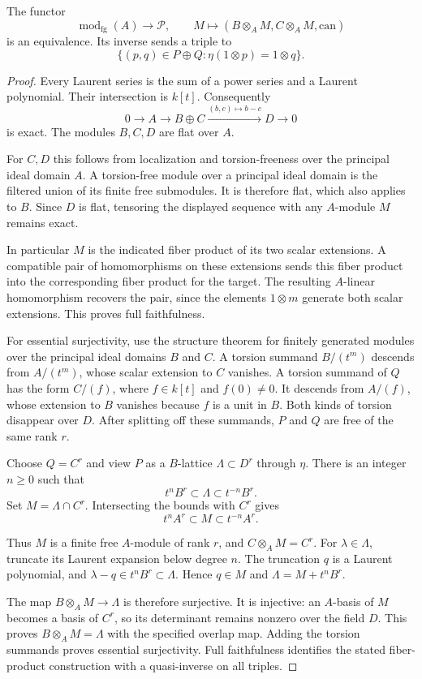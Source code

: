 \begin{theorem}
\label{v4-arith:ic:w5-h:formal-patching}
The functor
\[
 \operatorname{mod}_{\mathrm{fg}}(A)\longrightarrow\mathcal P,
 \qquad M\longmapsto(B\otimes_A M,C\otimes_A M,\mathrm{can})
\]
is an equivalence. Its inverse sends a triple to
\[
 \{(p,q)\in P\oplus Q:\eta(1\otimes p)=1\otimes q\}.
\]
\end{theorem}
\begin{proof}
Every Laurent series is the sum of a power series and a Laurent
polynomial. Their intersection is $k[t]$. Consequently
\[
 0\longrightarrow A\longrightarrow B\oplus C
 \xrightarrow{(b,c)\mapsto b-c}D\longrightarrow0
\]
is exact. The modules $B,C,D$ are flat over $A$.

For $C,D$ this follows from localization and torsion-freeness over
the principal ideal domain $A$. A torsion-free module over a principal ideal domain is the
filtered union of its finite free submodules. It is therefore flat,
which also applies to $B$.
Since $D$ is flat, tensoring the displayed sequence with any
$A$-module $M$ remains exact.

In particular $M$ is the indicated
fiber product of its two scalar extensions.
A compatible pair of homomorphisms on these extensions sends this
fiber product into the corresponding fiber product for the target.
The resulting $A$-linear homomorphism recovers the pair, since the
elements $1\otimes m$ generate both scalar extensions.
This proves full faithfulness.

For essential surjectivity, use the structure theorem for finitely
generated modules over the principal ideal domains $B$ and $C$.
A torsion summand $B/(t^m)$ descends from $A/(t^m)$, whose scalar
extension to $C$ vanishes. A torsion summand of $Q$ has the form
$C/(f)$, where $f\in k[t]$ and $f(0)\ne0$.
It descends from $A/(f)$, whose extension to $B$ vanishes because
$f$ is a unit in $B$. Both kinds of torsion disappear over $D$.
After splitting off these summands, $P$ and $Q$ are free of the
same rank $r$.

Choose $Q=C^r$ and view $P$ as a $B$-lattice
$\Lambda\subset D^r$ through $\eta$.
There is an integer $n\ge0$ such that
\[
 t^nB^r\subset\Lambda\subset t^{-n}B^r.
\]
Set $M=\Lambda\cap C^r$. Intersecting the bounds with $C^r$ gives
\[
 t^nA^r\subset M\subset t^{-n}A^r.
\]

Thus $M$ is a finite free $A$-module of rank $r$, and
$C\otimes_A M=C^r$.
For $\lambda\in\Lambda$, truncate its Laurent expansion below
degree $n$. The truncation $q$ is a Laurent polynomial, and
$\lambda-q\in t^nB^r\subset\Lambda$. Hence $q\in M$ and
$\Lambda=M+t^nB^r$.

The map $B\otimes_A M\to\Lambda$ is therefore
surjective. It is injective: an $A$-basis of $M$ becomes a basis
of $C^r$, so its determinant remains nonzero over the field $D$.
This proves $B\otimes_A M=\Lambda$ with the specified overlap map.
Adding the torsion summands proves essential surjectivity.
Full faithfulness identifies the stated fiber-product construction
with a quasi-inverse on all triples.
\end{proof}

